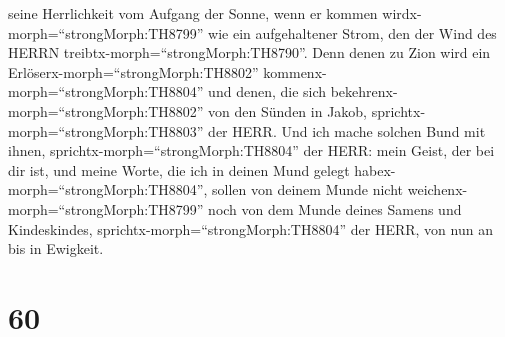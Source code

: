 seine Herrlichkeit vom Aufgang der Sonne, wenn er kommen
wirdx-morph=``strongMorph:TH8799'' wie ein aufgehaltener Strom, den der
Wind des HERRN treibtx-morph=``strongMorph:TH8790''.  Denn
denen zu Zion wird ein Erlöserx-morph=``strongMorph:TH8802''
kommenx-morph=``strongMorph:TH8804'' und denen, die sich
bekehrenx-morph=``strongMorph:TH8802'' von den Sünden in Jakob,
sprichtx-morph=``strongMorph:TH8803'' der HERR.  Und ich
mache solchen Bund mit ihnen, sprichtx-morph=``strongMorph:TH8804'' der
HERR: mein Geist, der bei dir ist, und meine Worte, die ich in deinen
Mund gelegt habex-morph=``strongMorph:TH8804'', sollen von deinem Munde
nicht weichenx-morph=``strongMorph:TH8799'' noch von dem Munde deines
Samens und Kindeskindes, sprichtx-morph=``strongMorph:TH8804'' der HERR,
von nun an bis in Ewigkeit.

\hypertarget{section-59}{%
\section{60}\label{section-59}}

